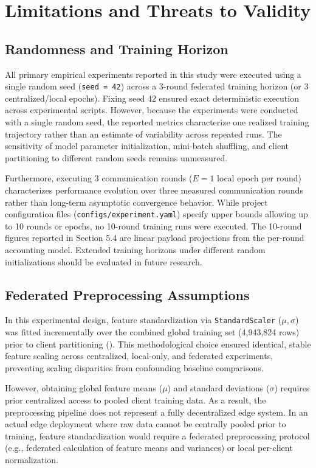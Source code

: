 \documentclass[11pt,a4paper]{article}
\begin{document}
\section{Limitations and Threats to Validity}

\subsection{Randomness and Training Horizon}
All primary empirical experiments reported in this study were executed using a single random seed (\texttt{seed = 42}) across a 3-round federated training horizon (or 3 centralized/local epochs). Fixing seed 42 ensured exact deterministic execution across experimental scripts. However, because the experiments were conducted with a single random seed, the reported metrics characterize one realized training trajectory rather than an estimate of variability across repeated runs. The sensitivity of model parameter initialization, mini-batch shuffling, and client partitioning to different random seeds remains unmeasured.

Furthermore, executing 3 communication rounds ($E=1$ local epoch per round) characterizes performance evolution over three measured communication rounds rather than long-term asymptotic convergence behavior. While project configuration files (\texttt{configs/experiment.yaml}) specify upper bounds allowing up to 10 rounds or epochs, no 10-round training runs were executed. The 10-round figures reported in Section 5.4 are linear payload projections from the per-round accounting model. Extended training horizons under different random initializations should be evaluated in future research.

\subsection{Federated Preprocessing Assumptions}
In this experimental design, feature standardization via \texttt{StandardScaler} ($\mu, \sigma$) was fitted incrementally over the combined global training set (4,943,824 rows) prior to client partitioning (\texttt{}). This methodological choice ensured identical, stable feature scaling across centralized, local-only, and federated experiments, preventing scaling disparities from confounding baseline comparisons.

However, obtaining global feature means ($\mu$) and standard deviations ($\sigma$) requires prior centralized access to pooled client training data. As a result, the preprocessing pipeline does not represent a fully decentralized edge system. In an actual edge deployment where raw data cannot be centrally pooled prior to training, feature standardization would require a federated preprocessing protocol (e.g., federated calculation of feature means and variances) or local per-client normalization.
\end{document}
